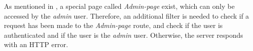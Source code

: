 As mentioned in , a special page called \textit{Admin-page} exist, which can only be accessed by the \textit{admin} user. Therefore, an additional filter is needed to check if a request has been made to the \textit{Admin-page} route, and check if the user is authenticated and if the user is the \textit{admin} user. Otherwise, the server responds with an HTTP error.
